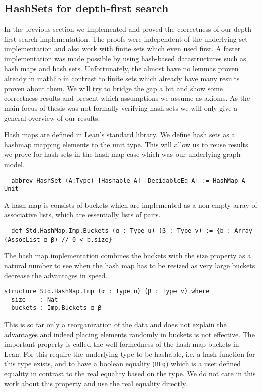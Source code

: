 \subsection{HashSets for depth-first search}

In the previous section we implemented and proved the correctness of our depth-first search implementation. The proofs were independent of the underlying set implementation and also work with finite sets which even used first. A faster implementation was made possible by using hash-based datastructures such as hash maps and hash sets. Unfortunately, the almost have no lemmas proven already in mathlib in contrast to finite sets which already have many results proven about them. We will try to bridge the gap a bit and show some correctness results and present which assumptions we assume as axioms. As the main focus of thesis was not formally verifying hash sets we will only give a general overview of our results.

Hash maps are defined in Lean's standard library. We define hash sets as a hashmap mapping elements to the unit type. This will allow us to reuse results we prove for hash sets in the hash map case which was our underlying graph model.

\begin{lstlisting}
  abbrev HashSet (A:Type) [Hashable A] [DecidableEq A] := HashMap A Unit
\end{lstlisting}

A hash map is consists of buckets which are implemented as a non-empty array of associative lists, which are essentially lists of pairs.

\begin{lstlisting}
  def Std.HashMap.Imp.Buckets (α : Type u) (β : Type v) := {b : Array (AssocList α β) // 0 < b.size}
\end{lstlisting}

The hash map implementation combines the buckets with the size property as a natural number to see when the hash map has to be resized as very large buckets decrease the advantages in speed. 

\begin{lstlisting}
structure Std.HashMap.Imp (α : Type u) (β : Type v) where
  size    : Nat
  buckets : Imp.Buckets α β
\end{lstlisting}

This is so far only a reorganization of the data and does not explain the advantages and indeed placing elements randomly in buckets is not effective. The important property is called the well-formedness of the hash map buckets in Lean. For this require the underlying type to be hashable, i.e. a hash function for this type exists, and to have a boolean equality (\lstinline|BEq|) which is a user defined equality in contrast to the real equality based on the type. We do not care in this work about this property and use the real equality directly.

